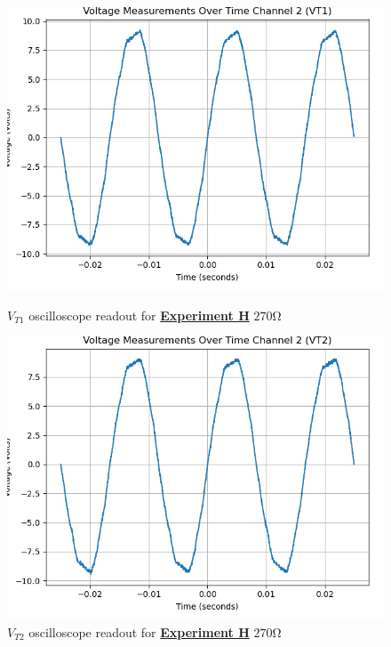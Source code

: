 \documentclass[
	letterpaper
	12pt
]{template}
\newcommand{\bref}[2]{\textbf{\hyperref[#1]{#2}}}
\begin{document}
\begin{figure}[H]\label{data::H2}
	\centering
	\begin{minipage}[c]{0.45\textwidth}
		\centering
		\includegraphics[width=\textwidth]{figures/H/3--ch2.png}
	    \caption{$V_{T1}$ oscilloscope readout for \bref{exp::H}{Experiment H} $270\unit{\ohm}$ }
	\end{minipage}
	\hfill
	\begin{minipage}[c]{0.45\textwidth}
		\centering
		\includegraphics[width=\textwidth]{figures/H/4--ch2.png}
	    \caption{$V_{T2}$ oscilloscope readout for \bref{exp::H}{Experiment H} $270\unit{\ohm}$ }
	\end{minipage}
\end{figure}
\end{document}

